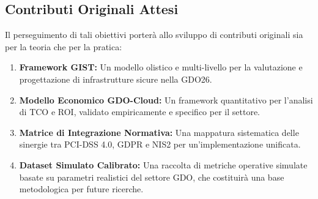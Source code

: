 \subsection{Contributi Originali Attesi}
Il perseguimento di tali obiettivi porterà allo sviluppo di contributi originali sia per la teoria che per la pratica:
\begin{enumerate}
    \item \textbf{Framework GIST:} Un modello olistico e multi-livello per la valutazione e progettazione di infrastrutture sicure nella GDO26.
    \item \textbf{Modello Economico GDO-Cloud:} Un framework quantitativo per l'analisi di TCO e ROI, validato empiricamente e specifico per il settore.
    \item \textbf{Matrice di Integrazione Normativa:} Una mappatura sistematica delle sinergie tra PCI-DSS 4.0, GDPR e NIS2 per un'implementazione unificata.
    \item \textbf{Dataset Simulato Calibrato:} Una raccolta di metriche operative simulate basate su parametri realistici del settore GDO, che costituirà una base metodologica per future ricerche.
\end{enumerate}



